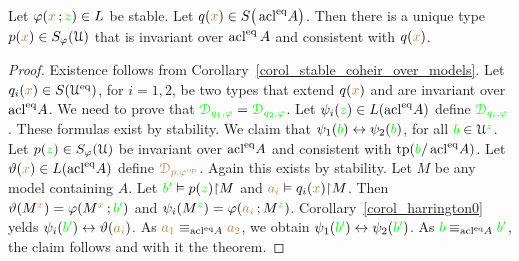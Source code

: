 \begin{theorem}[ (Stationarity)]\label{thm_stationarity}
  Let $\varphi({\color{brown} x}\,;{\color{green} z})\in L$ be stable.
  Let $q({\color{brown} x})\in S\big(\mathop{\rm acl}^{{\rm eq}}\!A\big)$.
  Then there is a unique type $p({\color{brown} x})\in S_\varphi(\EuScript U)$ that is invariant over $\mathop{\rm acl}^{{\rm eq}} A$ and consistent with $q({\color{brown} x})$.
\end{theorem}

\begin{proof}
  Existence follows from Corollary~\ref{corol_stable_coheir_over_models}.
  Let $q_i({\color{brown} x})\in S(\EuScript U^{{\rm eq}})$, for $i=1,2$, be two types that extend $q({\color{brown} x})$ and are invariant over $\mathop{\rm acl}^{{\rm eq}}\!A$.
  We need to prove that ${\color{green}\EuScript D_{q_1,\varphi}}={\color{green}\EuScript D_{q_2,\varphi}}$.
  Let $\psi_i({\color{green} z})\in L(\mathop{\rm acl}^{{\rm eq}}\!A)$ define ${\color{green}\EuScript D_{q_i,\varphi}}$.
  These formulas exist by stability.
  We claim that $\psi_1({\color{green} b})\leftrightarrow\psi_2({\color{green} b})$, for all ${\color{green} b}\in\EuScript U^{\color{green} z}$.
  Let $p({\color{green} z})\in S_\varphi(\EuScript U)$ be invariant over $\mathop{\rm acl}^{{\rm eq}}\!A$ and consistent with ${\rm tp}({\color{green} b}/\mathop{\rm acl}^{{\rm eq}}\!A)$.
  Let $\vartheta({\color{brown} x})\in L(\mathop{\rm acl}^{{\rm eq}}\!A)$ define ${\color{brown}\EuScript D_{p,\varphi^{\rm op}}}$.
  Again this exists by stability.
  Let $M$ be any model containing $A$.
  Let ${\color{green} b'}\vDash p({\color{green} z}){\restriction}M$ and ${\color{brown} a_i}\vDash q_i({\color{brown} x}){\restriction}M$.
  Then $\vartheta(M^{\color{brown} x})=\varphi(M^{\color{brown} x}\,;{\color{green} b'})$ and $\psi_i(M^{\color{green} z})=\varphi({\color{brown} a_i}\,;M^{\color{green} z})$.
  Corollary~\ref{corol_harrington0} yelds $\psi_i({\color{green} b'})\leftrightarrow\vartheta({\color{brown} a_i})$.
  As ${\color{brown} a_1}\equiv_{\mathop{\rm acl}^{{\rm eq}}\!A}{\color{brown} a_2}$, we obtain $\psi_1({\color{green} b'})\leftrightarrow\psi_2({\color{green} b'})$.
  As ${\color{green} b}\equiv_{\mathop{\rm acl}^{{\rm eq}}\!A}{\color{green} b'}$, the claim follows and with it the theorem.
\end{proof}





